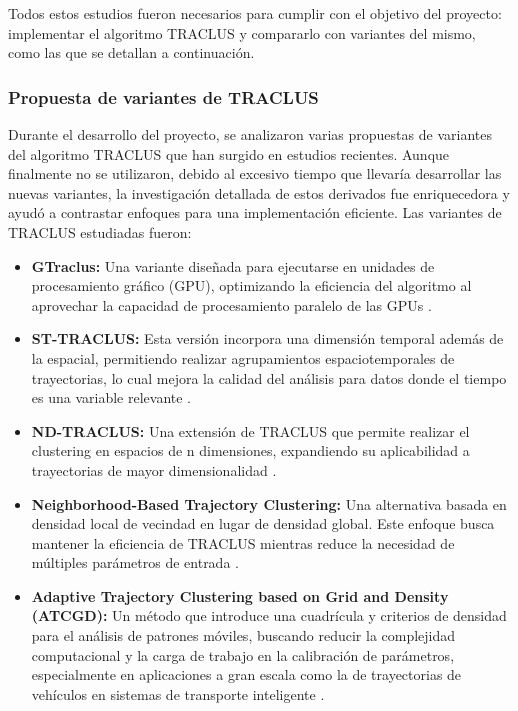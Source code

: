 Todos estos estudios fueron necesarios para cumplir con el objetivo del proyecto: implementar el algoritmo TRACLUS y compararlo con variantes del mismo, como las que se detallan a continuación.

\subsubsection{Propuesta de variantes de TRACLUS}

Durante el desarrollo del proyecto, se analizaron varias propuestas de variantes del algoritmo TRACLUS que han surgido en estudios recientes. Aunque finalmente no se utilizaron, debido al excesivo tiempo que llevaría desarrollar las nuevas variantes, la investigación detallada de estos derivados fue enriquecedora y ayudó a contrastar enfoques para una implementación eficiente. Las variantes de TRACLUS estudiadas fueron:

\begin{itemize}
    \item \textbf{GTraclus:} Una variante diseñada para ejecutarse en unidades de procesamiento gráfico (GPU), optimizando la eficiencia del algoritmo al aprovechar la capacidad de procesamiento paralelo de las GPUs \cite{gtraclus}.

    \item \textbf{ST-TRACLUS:} Esta versión incorpora una dimensión temporal además de la espacial, permitiendo realizar agrupamientos espaciotemporales de trayectorias, lo cual mejora la calidad del análisis para datos donde el tiempo es una variable relevante \cite{st-traclus}.

    \item \textbf{ND-TRACLUS:} Una extensión de TRACLUS que permite realizar el clustering en espacios de n dimensiones, expandiendo su aplicabilidad a trayectorias de mayor dimensionalidad \cite{nd-traclus}.

    \item \textbf{Neighborhood-Based Trajectory Clustering:} Una alternativa basada en densidad local de vecindad en lugar de densidad global. Este enfoque busca mantener la eficiencia de TRACLUS mientras reduce la necesidad de múltiples parámetros de entrada \cite{nb-traclus}.

    \item \textbf{Adaptive Trajectory Clustering based on Grid and Density (ATCGD):} Un método que introduce una cuadrícula y criterios de densidad para el análisis de patrones móviles, buscando reducir la complejidad computacional y la carga de trabajo en la calibración de parámetros, especialmente en aplicaciones a gran escala como la de trayectorias de vehículos en sistemas de transporte inteligente \cite{atcgd}.
\end{itemize}

